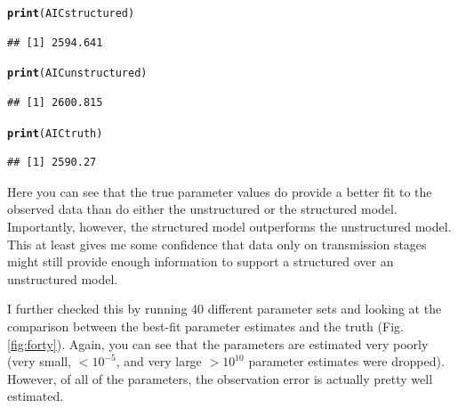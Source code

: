 \documentclass[12pt,reqno,final,pdftex]{amsart}\usepackage[]{graphicx}\usepackage[]{color}
\makeatletter
\newcommand{\hlstd}[1]{\textcolor[rgb]{0.345,0.345,0.345}{#1}}%
\newcommand{\hlkwd}[1]{\textcolor[rgb]{0.737,0.353,0.396}{\textbf{#1}}}%
\newenvironment{kframe}{%
 \def\at@end@of@kframe{}%
 \ifinner\ifhmode%
  \def\at@end@of@kframe{\end{minipage}}%
  \begin{minipage}{\columnwidth}%
 \fi\fi%
 \def\FrameCommand##1{\hskip\@totalleftmargin \hskip-\fboxsep
 \colorbox{shadecolor}{##1}\hskip-\fboxsep
     \hskip-\linewidth \hskip-\@totalleftmargin \hskip\columnwidth}%
 \MakeFramed {\advance\hsize-\width
   \@totalleftmargin\z@ \linewidth\hsize
   \@setminipage}}%
 {\par\unskip\endMakeFramed%
 \at@end@of@kframe}
\newenvironment{knitrout}{}{} %
\theoremstyle{plain}
\numberwithin{equation}{part}
\makeatother
\begin{document}
\begin{knitrout}\scriptsize
{}\color{fgcolor}\begin{kframe}
\begin{alltt}
\hlkwd{print}\hlstd{(AICstructured)}
\end{alltt}
\begin{verbatim}
## [1] 2594.641
\end{verbatim}
\begin{alltt}
\hlkwd{print}\hlstd{(AICunstructured)}
\end{alltt}
\begin{verbatim}
## [1] 2600.815
\end{verbatim}
\begin{alltt}
\hlkwd{print}\hlstd{(AICtruth)}
\end{alltt}
\begin{verbatim}
## [1] 2590.27
\end{verbatim}
\end{kframe}
\end{knitrout}

Here you can see that the true parameter values do provide a better fit to the observed data than do either the unstructured or the structured model.
Importantly, however, the structured model outperforms the unstructured model.
This at least gives me some confidence that data only on transmission stages might still provide enough information to support a structured over an unstructured model.

I further checked this by running 40 different parameter sets and looking at the comparison between the best-fit parameter estimates and the truth (Fig. \ref{fig:forty}).
Again, you can see that the parameters are estimated very poorly (very small, $< 10^{-5}$, and very large $>10^{10}$ parameter estimates were dropped).
However, of all of the parameters, the observation error is actually pretty well estimated.
\end{document}
